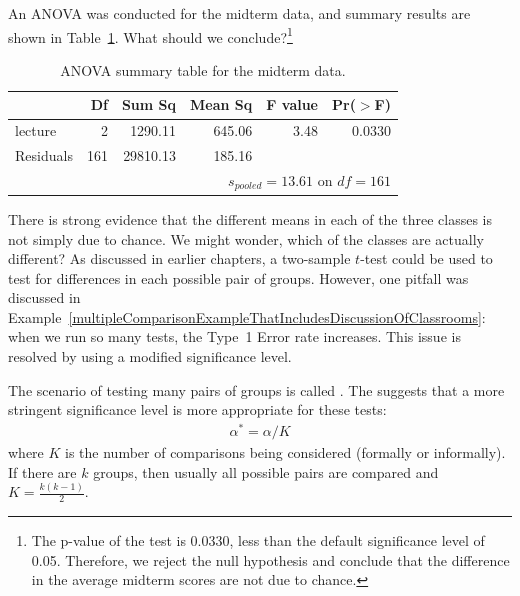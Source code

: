 \begin{exercise} \label{exerExaminingAnovaSummaryTableForMidtermData}
An ANOVA was conducted for the midterm data, and summary results are shown in Table~\ref{anovaSummaryTableForMidtermData}. What should we conclude?\footnote{The p-value of the test is 0.0330, less than the default significance level of 0.05. Therefore, we reject the null hypothesis and conclude that the difference in the average midterm scores are not due to chance.}
\end{exercise}

\begin{table}
\centering
\begin{tabular}{lrrrrr}
  \hline
 & Df & Sum Sq & Mean Sq & F value & Pr($>$F) \\ 
  \hline
lecture & 2 & 1290.11 & 645.06 & 3.48 & 0.0330 \\ 
  Residuals & 161 & 29810.13 & 185.16 &  &  \\ 
   \hline
\multicolumn{6}{r}{$s_{pooled}=13.61$ on $df=161$}
\end{tabular}
\caption{ANOVA summary table for the midterm data.}
\label{anovaSummaryTableForMidtermData}
\end{table}

There is strong evidence that the different means in each of the three classes is not simply due to chance. We might wonder, which of the classes are actually different? As discussed in earlier chapters, a two-sample $t$-test could be used to test for differences in each possible pair of groups. However, one pitfall was discussed in Example~\vref{multipleComparisonExampleThatIncludesDiscussionOfClassrooms}: when we run so many tests, the Type~1 Error rate increases. This issue is resolved by using a modified significance level.

\begin{termBox}{
The scenario of testing many pairs of groups is called . The  suggests that a more stringent significance level is more appropriate for these tests:
\begin{align*}
\alpha^* = \alpha / K
\end{align*}
where $K$ is the number of comparisons being considered (formally or informally). If there are $k$ groups, then usually all possible pairs are compared and $K=\frac{k(k-1)}{2}$.}
\end{termBox}

